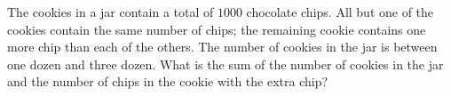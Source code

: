 The cookies in a jar contain a total of $1000$ chocolate chips. All but one of the cookies contain the same number of chips; the remaining cookie contains one more chip than each of the others. The number of cookies in the jar is between one dozen and three dozen. What is the sum of the number of cookies in the jar and the number of chips in the cookie with the extra chip?
